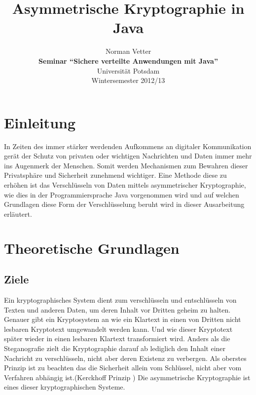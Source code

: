 \documentclass[paper=a4,11pt,german]{scrartcl} %
\begin{document}
%
\title{Asymmetrische Kryptographie in Java}

\author{Norman Vetter\\
\textbf{Seminar "`Sichere verteilte Anwendungen mit Java"'}\\
Universität Potsdam\\
Wintersemester 2012/13}

\date{}

\maketitle

%
\newpage
\tableofcontents
\newpage
\section{Einleitung}

In Zeiten des immer stärker werdenden Aufkommens an digitaler Kommunikation gerät der Schutz von privaten oder wichtigen Nachrichten und Daten immer mehr ins Augenmerk der Menschen. Somit werden Mechanismen zum Bewahren dieser Privatsphäre und Sicherheit zunehmend wichtiger. Eine Methode diese zu erhöhen ist das Verschlüsseln von Daten mittels asymmetrischer Kryptographie, wie dies in der Programmiersprache Java vorgenommen wird und auf welchen Grundlagen diese Form der Verschlüsselung beruht wird in dieser Ausarbeitung erläutert.
       
\section{Theoretische Grundlagen}

\subsection{Ziele}
Ein kryptographisches System dient zum verschlüsseln und entschlüsseln von Texten und anderen Daten, um deren Inhalt vor Dritten geheim zu halten. Genauer gibt ein Kryptosystem an wie ein Klartext in einen von Dritten nicht lesbaren Kryptotext umgewandelt werden kann. Und wie dieser Kryptotext später wieder in einen lesbaren Klartext transformiert wird. Anders als die Steganografie zielt die Kryptographie darauf ab lediglich den Inhalt einer Nachricht zu verschlüsseln, nicht aber deren Existenz zu verbergen. Als oberstes Prinzip ist zu beachten das die Sicherheit allein vom Schlüssel, nicht aber vom Verfahren abhängig ist.(Kerckhoff Prinzip \cite{Eckert13}) Die asymmetrische Kryptographie ist eines dieser kryptographischen Systeme.
\end{document}
